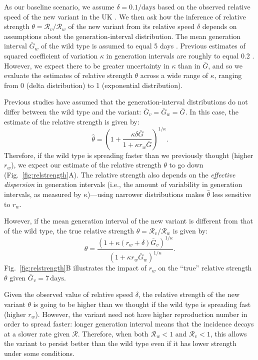 \documentclass[12pt]{article}
\newcommand{\fref}[1]{Fig.~\ref{fig:#1}}
\newcommand{\RR}{\ensuremath{{\mathcal R}}\xspace}
\begin{document}
As our baseline scenario, we assume $\delta = 0.1/\textrm{days}$ based on the observed relative speed of the new variant in the UK \citep{davies2021estimated}.
We then ask how the inference of relative strength $\theta = \RR_v/\RR_w$ of the new variant from its relative speed $\delta$ depends on assumptions about the generation-interval distribution.
The mean generation interval $\bar{G}_w$ of the wild type is assumed to equal 5 days \citep{ferretti2020quantifying}.
Previous estimates of squared coefficient of variation $\kappa$ in generation intervals are roughly to equal 0.2 \citep{ferretti2020quantifying}.
However, we expect there to be greater uncertainty in $\kappa$ than in $\bar{G}$, and so we evaluate the estimates of relative strength $\theta$ across a wide range of $\kappa$, ranging from 0 (delta distribution) to 1 (exponential distribution).

Previous studies have assumed that the generation-interval distributions do not differ between the wild type and the variant: $\bar{G}_v = \bar{G}_w = \bar{G}$.
In this case, the estimate of the relative strength is given by:
\begin{equation}
\hat{\theta} = \left(1 + \frac{\kappa \delta \bar{G}}{1 + \kappa r_w \bar{G}}\right)^{1/\kappa}.
\end{equation}
Therefore, if the wild type is spreading faster than we previously thought (higher $r_w$), we expect our estimate of the relative strength $\theta$ to go down (\fref{relstrength}A).
The relative strength also depends on the \emph{effective dispersion} in generation intervals (i.e., the amount of variability in generation intervals, as measured by $\kappa$)---using narrower distributions makes $\hat{\theta}$ less sensitive to $r_w$.

However, if the mean generation interval of the new variant is different from that of the wild type, the true relative strength $\theta = \RR_v/\RR_w$ is given by:
\begin{equation}
\theta = \frac{(1 + \kappa (r_w + \delta) \bar{G}_v)^{1/\kappa}}{(1 + \kappa r_w \bar{G}_w)^{1/\kappa}}.
\end{equation}
\fref{relstrength}B illustrates the impact of $r_w$ on the ``true'' relative strength $\theta$ given $\bar{G}_v=7\,\textrm{days}$.


Given the observed value of relative speed $\delta$,
the relative strength of the new variant $\theta$ is going to be higher than we thought if the wild type is spreading fast (higher $r_w$).
However, the variant need not have higher reproduction number in order to spread faster: longer generation interval means that the incidence decays at a slower rate given $\RR$. 
Therefore, when both $\RR_w < 1$ and $\RR_v < 1$, this allows the variant to persist better than the wild type even if it has lower strength under some conditions.
\end{document}
